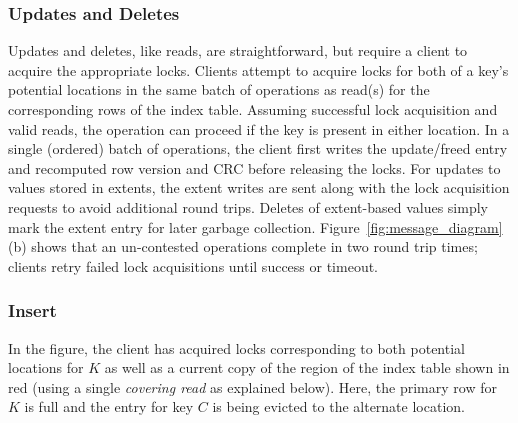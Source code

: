 \subsubsection{Updates and Deletes}

Updates and deletes, like reads, are straightforward, but require a
client to acquire the appropriate locks.  Clients attempt to acquire
locks for both of a key's potential locations in the same batch of
operations as read(s) for the corresponding rows of the index table.
Assuming successful lock acquisition and valid reads, the operation
can proceed if the key is present in either location.  In a single
(ordered) batch of operations, the client first writes the
update/freed entry and recomputed row version and CRC before releasing
the locks. For updates to values stored in extents, the extent writes
are sent along with the lock acquisition requests to avoid additional
round trips.  Deletes of extent-based values simply mark the extent
entry for later garbage collection.
Figure~\ref{fig:message_diagram}(b) shows that an un-contested
operations complete in two round trip times; clients retry failed lock
acquisitions until success or timeout.




\subsubsection{Insert}
\label{sec:insert}

In the figure, the client has acquired locks corresponding to both
potential locations for $K$ as well as a current copy of the region of
the index table shown in red (using a single \emph{covering read} as
explained below).  Here, the primary row for $K$ is full and the entry
for key $C$ is being evicted to the alternate location.

